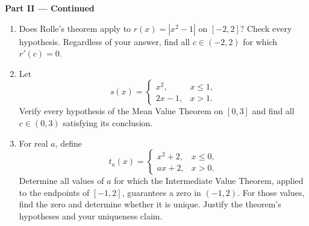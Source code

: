 \documentclass[11pt]{article}
\begin{document}
\newpage
\begin{center}
  {\large\textbf{Part II --- Continued}}
\end{center}

\begin{enumerate}[leftmargin=*,itemsep=0pt,resume]
  \item Does Rolle's theorem apply to $r(x)=|x^2-1|$ on $[-2,2]$?
  Check every hypothesis. Regardless of your answer, find all
  $c\in(-2,2)$ for which $r'(c)=0$.

  \item Let
  \[
    s(x)=
    \begin{cases}
      x^2, & x\le1,\\
      2x-1, & x>1.
    \end{cases}
  \]
  Verify every hypothesis of the Mean Value Theorem on $[0,3]$ and find
  all $c\in(0,3)$ satisfying its conclusion.

  \item For real $a$, define
  \[
    t_a(x)=
    \begin{cases}
      x^2+2, & x\le0,\\
      ax+2, & x>0.
    \end{cases}
  \]
  Determine all values of $a$ for which the Intermediate Value Theorem,
  applied to the endpoints of $[-1,2]$, guarantees a zero in $(-1,2)$.
  For those values, find the zero and determine whether it is unique.
  Justify the theorem's hypotheses and your uniqueness claim.
\end{enumerate}
\end{document}
